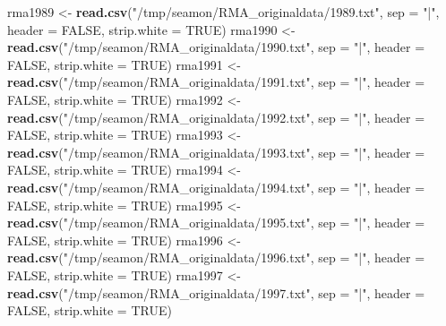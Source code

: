 \documentclass[]{article}
\newenvironment{Shaded}{\begin{snugshade}}{\end{snugshade}}
\newcommand{\DataTypeTok}[1]{\textcolor[rgb]{0.13,0.29,0.53}{#1}}
\newcommand{\KeywordTok}[1]{\textcolor[rgb]{0.13,0.29,0.53}{\textbf{#1}}}
\newcommand{\NormalTok}[1]{#1}
\newcommand{\OtherTok}[1]{\textcolor[rgb]{0.56,0.35,0.01}{#1}}
\newcommand{\StringTok}[1]{\textcolor[rgb]{0.31,0.60,0.02}{#1}}
\begin{document}
\begin{Shaded}
\begin{Highlighting}[]
\NormalTok{rma1989 <-}\StringTok{ }\KeywordTok{read.csv}\NormalTok{(}\StringTok{"/tmp/seamon/RMA_originaldata/1989.txt"}\NormalTok{, }\DataTypeTok{sep =} \StringTok{"|"}\NormalTok{, }\DataTypeTok{header =} \OtherTok{FALSE}\NormalTok{, }\DataTypeTok{strip.white =} \OtherTok{TRUE}\NormalTok{)}
\NormalTok{rma1990 <-}\StringTok{ }\KeywordTok{read.csv}\NormalTok{(}\StringTok{"/tmp/seamon/RMA_originaldata/1990.txt"}\NormalTok{, }\DataTypeTok{sep =} \StringTok{"|"}\NormalTok{, }\DataTypeTok{header =} \OtherTok{FALSE}\NormalTok{, }\DataTypeTok{strip.white =} \OtherTok{TRUE}\NormalTok{)}
\NormalTok{rma1991 <-}\StringTok{ }\KeywordTok{read.csv}\NormalTok{(}\StringTok{"/tmp/seamon/RMA_originaldata/1991.txt"}\NormalTok{, }\DataTypeTok{sep =} \StringTok{"|"}\NormalTok{, }\DataTypeTok{header =} \OtherTok{FALSE}\NormalTok{, }\DataTypeTok{strip.white =} \OtherTok{TRUE}\NormalTok{)}
\NormalTok{rma1992 <-}\StringTok{ }\KeywordTok{read.csv}\NormalTok{(}\StringTok{"/tmp/seamon/RMA_originaldata/1992.txt"}\NormalTok{, }\DataTypeTok{sep =} \StringTok{"|"}\NormalTok{, }\DataTypeTok{header =} \OtherTok{FALSE}\NormalTok{, }\DataTypeTok{strip.white =} \OtherTok{TRUE}\NormalTok{)}
\NormalTok{rma1993 <-}\StringTok{ }\KeywordTok{read.csv}\NormalTok{(}\StringTok{"/tmp/seamon/RMA_originaldata/1993.txt"}\NormalTok{, }\DataTypeTok{sep =} \StringTok{"|"}\NormalTok{, }\DataTypeTok{header =} \OtherTok{FALSE}\NormalTok{, }\DataTypeTok{strip.white =} \OtherTok{TRUE}\NormalTok{)}
\NormalTok{rma1994 <-}\StringTok{ }\KeywordTok{read.csv}\NormalTok{(}\StringTok{"/tmp/seamon/RMA_originaldata/1994.txt"}\NormalTok{, }\DataTypeTok{sep =} \StringTok{"|"}\NormalTok{, }\DataTypeTok{header =} \OtherTok{FALSE}\NormalTok{, }\DataTypeTok{strip.white =} \OtherTok{TRUE}\NormalTok{)}
\NormalTok{rma1995 <-}\StringTok{ }\KeywordTok{read.csv}\NormalTok{(}\StringTok{"/tmp/seamon/RMA_originaldata/1995.txt"}\NormalTok{, }\DataTypeTok{sep =} \StringTok{"|"}\NormalTok{, }\DataTypeTok{header =} \OtherTok{FALSE}\NormalTok{, }\DataTypeTok{strip.white =} \OtherTok{TRUE}\NormalTok{)}
\NormalTok{rma1996 <-}\StringTok{ }\KeywordTok{read.csv}\NormalTok{(}\StringTok{"/tmp/seamon/RMA_originaldata/1996.txt"}\NormalTok{, }\DataTypeTok{sep =} \StringTok{"|"}\NormalTok{, }\DataTypeTok{header =} \OtherTok{FALSE}\NormalTok{, }\DataTypeTok{strip.white =} \OtherTok{TRUE}\NormalTok{)}
\NormalTok{rma1997 <-}\StringTok{ }\KeywordTok{read.csv}\NormalTok{(}\StringTok{"/tmp/seamon/RMA_originaldata/1997.txt"}\NormalTok{, }\DataTypeTok{sep =} \StringTok{"|"}\NormalTok{, }\DataTypeTok{header =} \OtherTok{FALSE}\NormalTok{, }\DataTypeTok{strip.white =} \OtherTok{TRUE}\NormalTok{)}

\end{Highlighting}
\end{Shaded}
\end{document}
